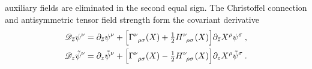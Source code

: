 auxiliary fields are eliminated in the second equal sign. The Christoffel connection and antisymmetric tensor field strength form the covariant derivative
\begin{subequations}
	\begin{align}
		\mathscr{D}_{\bar{z}}\psi^{\nu} &= \partial_{\bar{z}}\psi^{\nu}
		+\Bigl[\Gamma\indices{^\nu_\rho_\sigma}(X)+\tfrac{1}{2}H\indices{^\nu_\rho_\sigma}(X)\Bigr]\partial_{\bar{z}}X^{\rho}\psi^{\sigma} \:, \label{12.3.28a} \\
		\mathscr{D}_{z}\tilde{\psi}^{\nu} &= \partial_{z}\tilde{\psi}^{\nu} 
		+\Bigl[\Gamma\indices{^\nu_\rho_\sigma}(X)-\tfrac{1}{2}H\indices{^\nu_\rho_\sigma}(X)\Bigr]
		\partial_{z}X^{\rho}\tilde{\psi}^{\sigma} \:. \label{12.3.28b}
	\end{align} \label{12.3.28}
\end{subequations}
